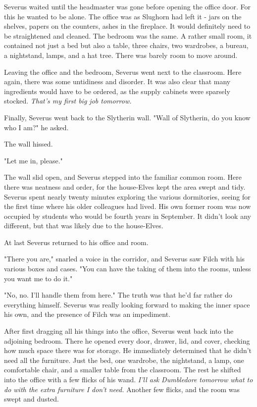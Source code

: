 Severus waited until the headmaster was gone before opening the office door. For this he wanted to be alone. The office was as Slughorn had left it - jars on the shelves, papers on the counters, ashes in the fireplace. It would definitely need to be straightened and cleaned. The bedroom was the same. A rather small room, it contained not just a bed but also a table, three chairs, two wardrobes, a bureau, a nightstand, lamps, and a hat tree. There was barely room to move around.

Leaving the office and the bedroom, Severus went next to the classroom. Here again, there was some untidiness and disorder. It was also clear that many ingredients would have to be ordered, as the supply cabinets were sparsely stocked. \emph{That's my first big job tomorrow.}

Finally, Severus went back to the Slytherin wall. "Wall of Slytherin, do you know who I am?" he asked.

The wall hissed.

"Let me in, please."

The wall slid open, and Severus stepped into the familiar common room. Here there was neatness and order, for the house-Elves kept the area swept and tidy. Severus spent nearly twenty minutes exploring the various dormitories, seeing for the first time where his older colleagues had lived. His own former room was now occupied by students who would be fourth years in September. It didn't look any different, but that was likely due to the house-Elves.

At last Severus returned to his office and room.

"There you are," snarled a voice in the corridor, and Severus saw Filch with his various boxes and cases. "You can have the taking of them into the rooms, unless you want me to do it."

"No, no. I'll handle them from here." The truth was that he'd far rather do everything himself. Severus was really looking forward to making the inner space his own, and the presence of Filch was an impediment.

After first dragging all his things into the office, Severus went back into the adjoining bedroom. There he opened every door, drawer, lid, and cover, checking how much space there was for storage. He immediately determined that he didn't need all the furniture. Just the bed, one wardrobe, the nightstand, a lamp, one comfortable chair, and a smaller table from the classroom. The rest he shifted into the office with a few flicks of his wand. \emph{I'll ask Dumbledore tomorrow what to do with the extra furniture I don't need.} Another few flicks, and the room was swept and dusted.

